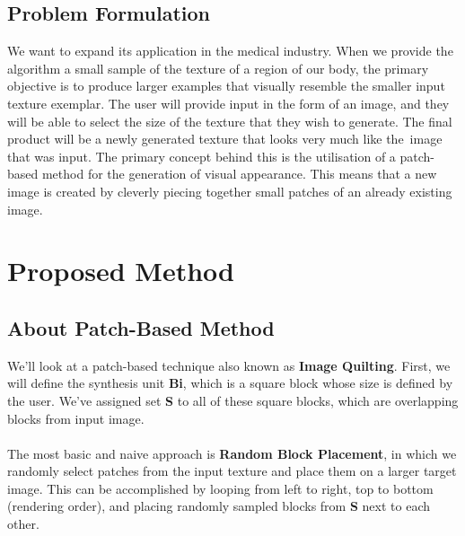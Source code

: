 \documentclass[12pt,a4paper]{report}
\begin{document}
\section{Problem Formulation}
We want to expand its application in the medical industry. When we provide the algorithm a small sample of the texture of a region of our body, the primary objective is to produce larger examples that visually resemble the smaller input texture exemplar. The user will provide input in the form of an image, and they will be able to select the size of the texture that they wish to generate. The final product will be a newly generated texture that looks very much like the image that was input. The primary concept behind this is the utilisation of a patch-based method for the generation of visual appearance. This means that a new image is created by cleverly piecing together small patches of an already existing image.



\chapter{Proposed Method}

\section{About Patch-Based Method}
We'll look at a patch-based technique also known as \textbf{Image Quilting}. First, we will define the synthesis unit \textbf{Bi}, which is a square block whose size is defined by the user. We've assigned set \textbf{S} to all of these square blocks, which are overlapping blocks from input image.
\\\\
The most basic and naive approach is \textbf{Random Block Placement}, in which we randomly select patches from the input texture and place them on a larger target image. This can be accomplished by looping from left to right, top to bottom (rendering order), and placing randomly sampled blocks from \textbf{S} next to each other.
\end{document}
